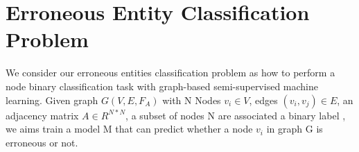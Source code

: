 \vspace{-1ex}
\section{Erroneous Entity Classification Problem}
\label{sec-def2}
We consider our erroneous entities classification problem as how to perform a node binary classification task with graph-based semi-supervised machine learning. Given graph $G (V,E,F_{A})$ with N Nodes  $v_i \in V$, edges $(v_i,v_j) \in E$, an  adjacency matrix $A \in R^{N * N}$,
a subset of nodes N are associated a binary label , we aims train a model M that can predict whether a node $v_i$ in graph G is erroneous or not.


